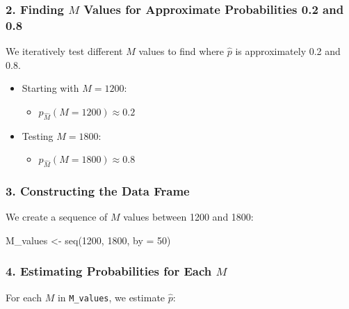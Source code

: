 \documentclass[
  letterpaper,
  DIV=11,
  numbers=noendperiod]{scrartcl}
\newenvironment{Shaded}{\begin{snugshade}}{\end{snugshade}}
\newcommand{\AttributeTok}[1]{\textcolor[rgb]{0.98,0.46,0.51}{#1}}
\newcommand{\DecValTok}[1]{\textcolor[rgb]{0.47,0.72,1.00}{#1}}
\newcommand{\FunctionTok}[1]{\textcolor[rgb]{0.70,0.57,0.94}{#1}}
\newcommand{\NormalTok}[1]{\textcolor[rgb]{0.88,0.89,0.91}{#1}}
\newcommand{\OtherTok}[1]{\textcolor[rgb]{0.70,0.57,0.94}{#1}}
\providecommand{\tightlist}{%
  \setlength{\itemsep}{0pt}\setlength{\parskip}{0pt}}\usepackage{longtable,booktabs,array}
\begin{document}
\subsubsection{\texorpdfstring{2. Finding \(M\) Values for Approximate
Probabilities 0.2 and
0.8}{2. Finding M Values for Approximate Probabilities 0.2 and 0.8}}\label{finding-m-values-for-approximate-probabilities-0.2-and-0.8}

We iteratively test different \(M\) values to find where \(\hat{p}\) is
approximately 0.2 and 0.8.

\begin{itemize}
\tightlist
\item
  Starting with \(M = 1200\):

  \begin{itemize}
  \tightlist
  \item
    \(p_{\hat{M}}(M = 1200) \approx 0.2\)
  \end{itemize}
\item
  Testing \(M = 1800\):

  \begin{itemize}
  \tightlist
  \item
    \(p_{\hat{M}}(M = 1800) \approx 0.8\)
  \end{itemize}
\end{itemize}

\subsubsection{3. Constructing the Data
Frame}\label{constructing-the-data-frame}

We create a sequence of \(M\) values between 1200 and 1800:

\begin{Shaded}
\begin{Highlighting}[]
\NormalTok{M\_values }\OtherTok{\textless{}{-}} \FunctionTok{seq}\NormalTok{(}\DecValTok{1200}\NormalTok{, }\DecValTok{1800}\NormalTok{, }\AttributeTok{by =} \DecValTok{50}\NormalTok{)}
\end{Highlighting}
\end{Shaded}

\subsubsection{\texorpdfstring{4. Estimating Probabilities for Each
\(M\)}{4. Estimating Probabilities for Each M}}\label{estimating-probabilities-for-each-m}

For each \(M\) in \texttt{M\_values}, we estimate \(\hat{p}\):
\end{document}
